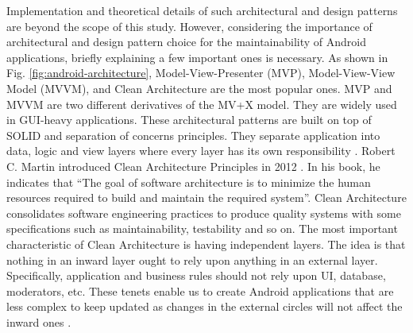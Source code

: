 Implementation and theoretical details of such architectural and design patterns are beyond the scope of this study. However, considering the importance of architectural and design pattern choice for the maintainability of Android applications, briefly explaining a few important ones is necessary. As shown in Fig. \ref{fig:android-architecture}, Model-View-Presenter (MVP), Model-View-View Model (MVVM), and Clean Architecture are the most popular ones. MVP and MVVM are two different derivatives of the MV+X model. They are widely used in GUI-heavy applications. These architectural patterns are built on top of SOLID and separation of concerns principles. They separate application into data, logic and view layers where every layer has its own responsibility \cite{48}. Robert C. Martin introduced Clean Architecture Principles in 2012 \cite{10}. In his book, he indicates that “The goal of software architecture is to minimize the human resources required to build and maintain the required system”. Clean Architecture consolidates software engineering practices to produce quality systems with some specifications such as maintainability, testability and so on. The most important characteristic of Clean Architecture is having independent layers. The idea is that nothing in an inward layer ought to rely upon anything in an external layer. Specifically, application and business rules should not rely upon UI, database, moderators, etc. These tenets enable us to create Android applications that are less complex to keep updated as changes in the external circles will not affect the inward ones \cite{58}.